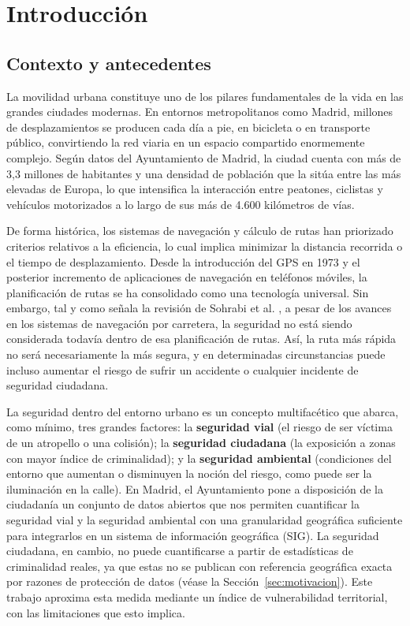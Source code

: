 \chapter{Introducción}
\label{cap:introduccion}

\section{Contexto y antecedentes}
\label{sec:contexto}

La movilidad urbana constituye uno de los pilares fundamentales de la vida en las grandes ciudades modernas. En entornos metropolitanos como Madrid, millones de desplazamientos se producen cada día a pie, en bicicleta o en transporte público, convirtiendo la red viaria en un espacio compartido enormemente complejo. Según datos del Ayuntamiento de Madrid, la ciudad cuenta con más de 3,3 millones de habitantes y una densidad de población que la sitúa entre las más elevadas de Europa, lo que intensifica la interacción entre peatones, ciclistas y vehículos motorizados a lo largo de sus más de 4.600 kilómetros de vías.

De forma histórica, los sistemas de navegación y cálculo de rutas han priorizado criterios relativos a la eficiencia, lo cual implica minimizar la distancia recorrida o el tiempo de desplazamiento. Desde la introducción del GPS en 1973 \cite{bray2014} y el posterior incremento de aplicaciones de navegación en teléfonos móviles, la planificación de rutas se ha consolidado como una tecnología universal. Sin embargo, tal y como señala la revisión de Sohrabi et al. \cite{sohrabi2022}, a pesar de los avances en los sistemas de navegación por carretera, la seguridad no está siendo considerada todavía dentro de esa planificación de rutas. Así, la ruta más rápida no será necesariamente la más segura, y en determinadas circunstancias puede incluso aumentar el riesgo de sufrir un accidente o cualquier incidente de seguridad ciudadana.

La seguridad dentro del entorno urbano es un concepto multifacético que abarca, como mínimo, tres grandes factores: la \textbf{seguridad vial} (el riesgo de ser víctima de un atropello o una colisión); la \textbf{seguridad ciudadana} (la exposición a zonas con mayor índice de criminalidad); y la \textbf{seguridad ambiental} (condiciones del entorno que aumentan o disminuyen la noción del riesgo, como puede ser la iluminación en la calle). En Madrid, el Ayuntamiento pone a disposición de la ciudadanía un conjunto de datos abiertos que nos permiten cuantificar la seguridad vial y la seguridad ambiental con una granularidad geográfica suficiente para integrarlos en un sistema de información geográfica (SIG). La seguridad ciudadana, en cambio, no puede cuantificarse a partir de estadísticas de criminalidad reales, ya que estas no se publican con referencia geográfica exacta por razones de protección de datos (véase la Sección~\ref{sec:motivacion}). Este trabajo aproxima esta medida mediante un índice de vulnerabilidad territorial, con las limitaciones que esto implica.

